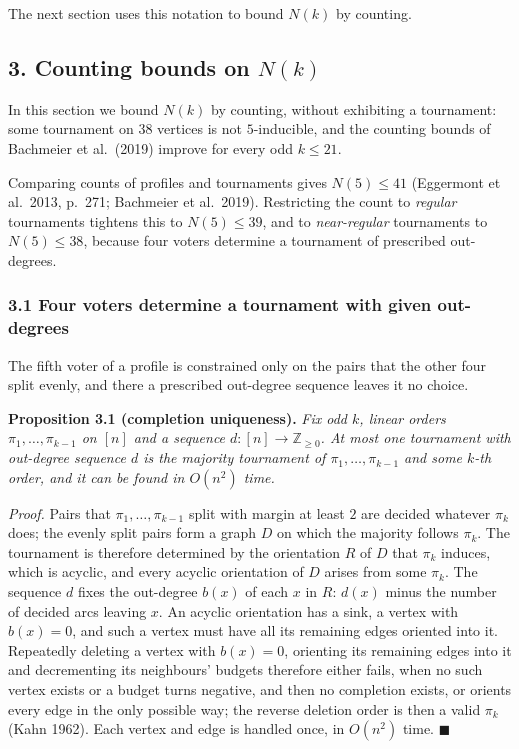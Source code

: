 \documentclass[
]{article}
\begin{document}
The next section uses this notation to bound \(N(k)\) by counting.

\subsection{\texorpdfstring{3. Counting bounds on
\(N(k)\)}{3. Counting bounds on N(k)}}\label{counting-bounds-on-nk}

In this section we bound \(N(k)\) by counting, without exhibiting a
tournament: some tournament on \(38\) vertices is not \(5\)-inducible,
and the counting bounds of Bachmeier et al.~(2019) improve for every odd
\(k \le 21\).

Comparing counts of profiles and tournaments gives \(N(5) \le 41\)
(Eggermont et al.~2013, p.~271; Bachmeier et al.~2019). Restricting the
count to \emph{regular} tournaments tightens this to \(N(5) \le 39\),
and to \emph{near-regular} tournaments to \(N(5) \le 38\), because four
voters determine a tournament of prescribed out-degrees.

\subsubsection{3.1 Four voters determine a tournament with given
out-degrees}\label{four-voters-determine-a-tournament-with-given-out-degrees}

The fifth voter of a profile is constrained only on the pairs that the
other four split evenly, and there a prescribed out-degree sequence
leaves it no choice.

\textbf{Proposition 3.1 (completion uniqueness).} \emph{Fix odd \(k\),
linear orders \(\pi_1, \dots, \pi_{k-1}\) on \([n]\) and a sequence
\(d \colon [n] \to \mathbb{Z}_{\ge 0}\). At most one tournament with
out-degree sequence \(d\) is the majority tournament of
\(\pi_1, \dots, \pi_{k-1}\) and some \(k\)-th order, and it can be found
in \(O(n^2)\) time.}

\emph{Proof.} Pairs that \(\pi_1, \dots, \pi_{k-1}\) split with margin
at least \(2\) are decided whatever \(\pi_k\) does; the evenly split
pairs form a graph \(D\) on which the majority follows \(\pi_k\). The
tournament is therefore determined by the orientation \(R\) of \(D\)
that \(\pi_k\) induces, which is acyclic, and every acyclic orientation
of \(D\) arises from some \(\pi_k\). The sequence \(d\) fixes the
out-degree \(b(x)\) of each \(x\) in \(R\): \(d(x)\) minus the number of
decided arcs leaving \(x\). An acyclic orientation has a sink, a vertex
with \(b(x) = 0\), and such a vertex must have all its remaining edges
oriented into it. Repeatedly deleting a vertex with \(b(x) = 0\),
orienting its remaining edges into it and decrementing its neighbours'
budgets therefore either fails, when no such vertex exists or a budget
turns negative, and then no completion exists, or orients every edge in
the only possible way; the reverse deletion order is then a valid
\(\pi_k\) (Kahn 1962). Each vertex and edge is handled once, in
\(O(n^2)\) time. \(\blacksquare\)
\end{document}

